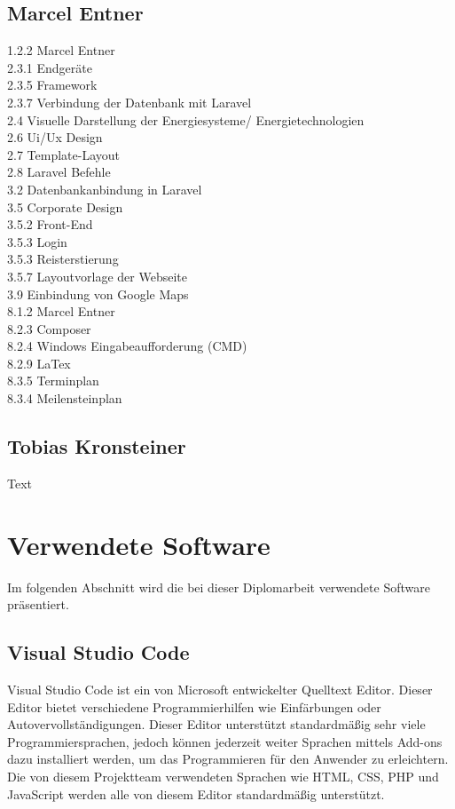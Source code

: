 \subsection{Marcel Entner}
1.2.2 Marcel Entner \\
2.3.1 Endgeräte \\ 
2.3.5 Framework \\
2.3.7 Verbindung der Datenbank mit Laravel \\
2.4 Visuelle Darstellung der Energiesysteme/ Energietechnologien  \\
2.6 Ui/Ux Design  \\
2.7 Template-Layout  \\
2.8 Laravel Befehle \\
3.2 Datenbankanbindung in Laravel \\
3.5 Corporate Design \\
3.5.2 Front-End \\
3.5.3 Login \\
3.5.3 Reisterstierung \\
3.5.7 Layoutvorlage der Webseite \\
3.9 Einbindung von Google Maps \\
8.1.2 Marcel Entner \\
8.2.3 Composer \\
8.2.4 Windows Eingabeaufforderung (CMD) \\
8.2.9 LaTex  \\
8.3.5 Terminplan \\
8.3.4 Meilensteinplan \\

\subsection{Tobias Kronsteiner}
Text

\newpage
\section{Verwendete Software}
Im folgenden Abschnitt wird die bei dieser Diplomarbeit verwendete Software präsentiert.


\subsection{Visual Studio Code}
Visual Studio Code ist ein von Microsoft entwickelter Quelltext Editor. Dieser Editor bietet verschiedene Programmierhilfen wie Einfärbungen oder Autovervollständigungen. Dieser Editor unterstützt standardmäßig sehr viele Programmiersprachen, jedoch können jederzeit weiter Sprachen mittels Add-ons dazu installiert werden, um das Programmieren für den Anwender zu erleichtern. Die von diesem Projektteam verwendeten Sprachen wie HTML, CSS, PHP und JavaScript werden alle von diesem Editor standardmäßig unterstützt. 


